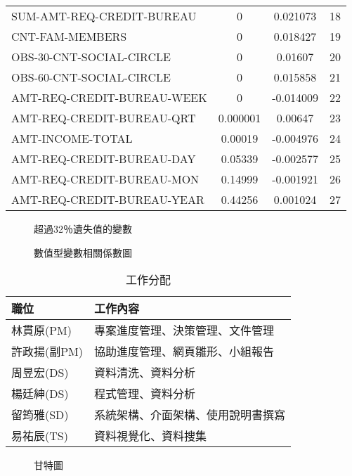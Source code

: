 \documentclass[12pt, a4paper]{article}
\begin{document}
\begin{table} [h]
{\begin{tabular}{lccc}
    SUM-AMT-REQ-CREDIT-BUREAU  & 0        &  0.021073 & 18\\\rowcolor{mistyrose}
    CNT-FAM-MEMBERS            & 0        &  0.018427 & 19\\\rowcolor{bubbles}
    OBS-30-CNT-SOCIAL-CIRCLE   & 0        &  0.01607  & 20\\\rowcolor{mistyrose}
    OBS-60-CNT-SOCIAL-CIRCLE   & 0        &  0.015858 & 21\\\rowcolor{bubbles}
    AMT-REQ-CREDIT-BUREAU-WEEK & 0        & -0.014009 & 22\\\rowcolor{mistyrose}
    AMT-REQ-CREDIT-BUREAU-QRT  & 0.000001 &  0.00647  & 23\\\rowcolor{bubbles}
    AMT-INCOME-TOTAL           & 0.00019  & -0.004976 & 24\\\rowcolor{mistyrose}
    AMT-REQ-CREDIT-BUREAU-DAY  & 0.05339  & -0.002577 & 25\\\rowcolor{bubbles}
    AMT-REQ-CREDIT-BUREAU-MON  & 0.14999  & -0.001921 & 26\\\rowcolor{mistyrose}
    AMT-REQ-CREDIT-BUREAU-YEAR & 0.44256  &  0.001024 & 27\\\hline
    \end{tabular}
    }
\end{table}








\begin{figure}[h]
    \caption{超過32％遺失值的變數}
    \label{fig:超過32％遺失值的變數}
\end{figure}

\begin{figure}[h]
    \caption{數值型變數相關係數圖}
    \label{fig:數值型變數相關係數圖}
\end{figure}

\begin{table}[h]
\begin{center}
\caption{工作分配}
\label{tb:工作分配}
\extrarowheight=4pt
\begin{tabular}{ll}
\rowcolor[gray]{.9}
職位	   &	 	工作內容\\
\toprule
林貫原(PM)   &專案進度管理、決策管理、文件管理	\\
許政揚(副PM) &協助進度管理、網頁雛形、小組報告	\\
周昱宏(DS)   &資料清洗、資料分析	\\
楊廷紳(DS)   &程式管理、資料分析	\\
留筠雅(SD)   &系統架構、介面架構、使用說明書撰寫    \\
易祐辰(TS)   &資料視覺化、資料搜集    \\
\bottomrule
\end{tabular}
\end{center}
\end{table}

\begin{figure}[h]
    \caption{甘特圖}
    \label{fig:甘特圖}
\end{figure}
\end{document}
